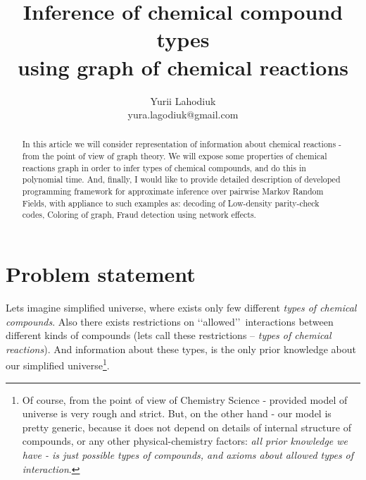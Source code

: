 \documentclass[10pt]{article}
\begin{document}
\title{Inference of chemical compound types \\ using graph of chemical reactions}
\author{Yurii Lahodiuk \\ yura.lagodiuk@gmail.com}
\date{}
\maketitle

\begin{abstract}
In this article we will consider representation of information about chemical reactions - from the point of view of graph theory. We will expose some properties of chemical reactions graph in order to infer types of chemical compounds, and do this in polynomial time. And, finally, I would like to provide detailed description of developed programming framework\cite{project_on_github} for approximate inference over pairwise Markov Random Fields, with appliance to such examples as: decoding of Low-density parity-check codes, Coloring of graph, Fraud detection using network effects\cite{fraud_detection}.
\end{abstract}

\section{Problem statement}
Lets imagine simplified universe, where exists only few different \emph{types of chemical compounds}. 
Also there exists restrictions on \lq \lq allowed\rq \rq\ interactions between different kinds of compounds (lets call these restrictions -- \emph{types of chemical reactions}). And information about these types, is the only prior knowledge about our simplified universe\footnote{Of course, from the point of view of Chemistry Science - provided model of universe is very rough and strict. But, on the other hand - our model is pretty generic, because it does not depend on details of internal structure of compounds, or any other physical-chemistry factors: \emph{all prior knowledge we have - is just possible types of compounds, and axioms about allowed types of interaction}.}.\\
\end{document}
